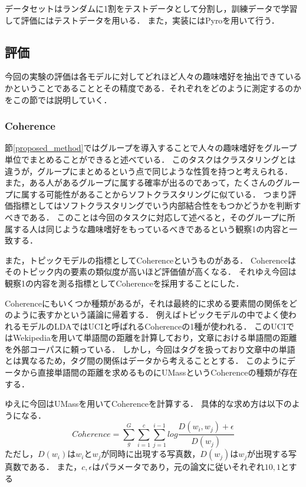 \documentclass[a4j,10pt, twocolumn]{jarticle}
\begin{document}
データセットはランダムに1割をテストデータとして分割し，訓練データで学習して評価にはテストデータを用いる．
また，実装にはPyroを用いて行う．

\subsection{評価} \label{evaluation}
今回の実験の評価は各モデルに対してどれほど人々の趣味嗜好を抽出できているかということであることとその精度である．それぞれをどのように測定するのかをこの節では説明していく．

\subsubsection{Coherence} \label{coherence}
節\ref{proposed_method}ではグループを導入することで人々の趣味嗜好をグループ単位でまとめることができると述べている．
このタスクはクラスタリングとは違うが，グループにまとめるという点で同じような性質を持つと考えられる．
また，ある人があるグループに属する確率が出るのであって，たくさんのグループに属する可能性があることからソフトクラスタリングに似ている．
つまり評価指標としてはソフトクラスタリングでいう内部結合性をもつかどうかを判断すべきである．
このことは今回のタスクに対応して述べると，そのグループに所属する人は同じような趣味嗜好をもっているべきであるという観察1の内容と一致する．

また，トピックモデルの指標としてCoherence\cite{first-coherence}というものがある．
Coherenceはそのトピック内の要素の類似度が高いほど評価値が高くなる．
それゆえ今回は観察1の内容を測る指標としてCoherenceを採用することにした．

Coherenceにもいくつか種類があるが，それは最終的に求める要素間の関係をどのように表すかという議論に帰着する．
例えばトピックモデルの中でよく使われるモデルのLDA\cite{blei2003latent}ではUCI\cite{newman2010automatic}と呼ばれるCoherenceの1種が使われる．
このUCIではWekipediaを用いて単語間の距離を計算しており，文章における単語間の距離を外部コーパスに頼っている．
しかし，今回はタグを扱っており文章中の単語とは異なるため，タグ間の関係はデータから考えることとする．
このようにデータから直接単語間の距離を求めるものにUMass\cite{mimno2011optimizing}というCoherenceの種類が存在する．

ゆえに今回はUMassを用いてCoherenceを計算する．
具体的な求め方は以下のようになる．
\begin{equation*}
  Coherence = \sum_g^G \sum_{i=1}^c \sum_{j=1}^{i-1} log \frac{D(w_i, w_j) + \epsilon}{D(w_j)}
\end{equation*}
ただし，$D(w_i)$は$w_i$と$w_j$が同時に出現する写真数，$D(w_j)$は$w_j$が出現する写真数である．
また，$c, \epsilon$はパラメータであり，元の論文\cite{mimno2011optimizing}に従いそれぞれ$10, 1$とする
\end{document}
